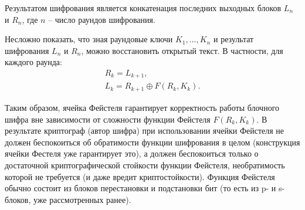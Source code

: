 Результатом шифрования является конкатенация последних выходных блоков $L_n$ и $R_n$, где $n$ -- число раундов шифрования.

Несложно показать, что зная раундовые ключи $K_1, \dots, K_n$ и результат шифрования $L_n$ и $R_n$, можно восстановить открытый текст. В частности, для каждого раунда:
\[\begin{array}{l}
    R_k = L_{k+1}, \\
    L_k = R_{k+1} \oplus F\left( R_k, K_k \right).
\end{array}\]

Таким образом, ячейка Фейстеля гарантирует корректность работы блочного шифра вне зависимости от сложности функции Фейстеля $F\left(R_k, K_k \right)$. В результате криптограф (автор шифра) при использовании ячейки Фейстеля не должен беспокоиться об обратимости функции шифрования в целом (конструкция ячейки Фестеля уже гарантирует это), а должен беспокоиться только о достаточной криптографической стойкости функции Фейстеля, необратимость которой не требуется (и даже вредит криптостойкости). Функция Фейстеля обычно состоит из блоков перестановки и подстановки бит (то есть из p- и s-блоков, уже рассмотренных ранее).

